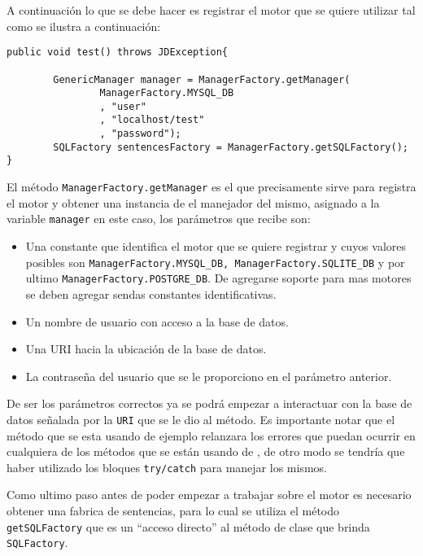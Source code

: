 A continuación lo que se debe hacer es registrar el motor que se quiere utilizar tal como se ilustra a continuación:	
%
\begin{lstlisting}[title=Registrando el motor que se quiere utilizar.]
public void test() throws JDException{
		
		GenericManager manager = ManagerFactory.getManager(
				ManagerFactory.MYSQL_DB
				, "user"
				, "localhost/test"
				, "password");
		SQLFactory sentencesFactory = ManagerFactory.getSQLFactory();
}
\end{lstlisting}
%
El método \verb=ManagerFactory.getManager= es el que precisamente sirve para registra el motor y obtener una instancia de el manejador del mismo, asignado a la variable \verb=manager= en este caso, los parámetros que recibe son:
\begin{itemize}
\item Una constante que identifica el motor que se quiere registrar y cuyos valores posibles son \verb=ManagerFactory.MYSQL_DB, ManagerFactory.SQLITE_DB= y por ultimo \verb=ManagerFactory.POSTGRE_DB=. De agregarse soporte para mas motores se deben agregar sendas constantes identificativas.
\item Un nombre de usuario con acceso a la base de datos.
\item Una URI hacia la ubicación de la base de datos.
\item La contraseña del usuario que se le proporciono en el parámetro anterior.
\end{itemize}
De ser los parámetros correctos ya se podrá empezar a interactuar con la base de datos señalada por la \verb=URI= que se le dio al método. Es importante notar que el método que se esta usando de ejemplo relanzara los errores que puedan ocurrir en cualquiera de los métodos que se están usando de \jj, de otro modo se tendría que haber utilizado los bloques \verb=try/catch= para manejar los mismos.

Como ultimo paso antes de poder empezar a trabajar sobre el motor es necesario obtener una fabrica de sentencias, para lo cual se utiliza el método \verb=getSQLFactory= que es un ``acceso directo'' al método de clase que brinda \verb=SQLFactory=.
%

